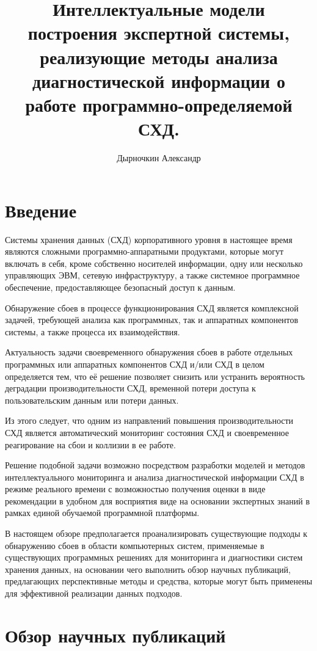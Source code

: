 \documentclass[12pt,a4paper]{article}
\title{Интеллектуальные модели построения экспертной системы, реализующие методы анализа диагностической информации о работе программно-определяемой СХД.}
\author{Дырночкин Александр}
\date{}
\begin{document}
\maketitle

\section*{Введение}

Системы хранения данных (СХД) корпоративного уровня в настоящее время являются сложными программно-аппаратными продуктами, которые могут включать в себя, кроме собственно носителей информации, одну или несколько управляющих ЭВМ, сетевую инфраструктуру, а также системное программное обеспечение, предоставляющее безопасный доступ к данным.

Обнаружение сбоев в процессе функционирования СХД является комплексной задачей, требующей анализа как программных, так и аппаратных компонентов системы, а также процесса их взаимодействия.

Актуальность задачи своевременного обнаружения сбоев в работе отдельных программных или аппаратных компонентов СХД и/или СХД в целом определяется тем, что её решение позволяет снизить или устранить вероятность деградации производительности СХД, временной потери доступа к пользовательским данным или потери данных.

Из этого следует, что одним из направлений повышения производительности СХД является автоматический мониторинг состояния СХД и своевременное реагирование на сбои и коллизии в ее работе.

Решение подобной задачи возможно посредством разработки моделей и методов интеллектуального мониторинга и анализа диагностической информации СХД в режиме реального времени с возможностью получения оценки в виде рекомендации в удобном для восприятия виде на основании экспертных знаний в рамках единой обучаемой программной платформы.

В настоящем обзоре предполагается проанализировать существующие подходы к обнаружению сбоев в области компьютерных систем, применяемые в существующих программных решениях для мониторинга и диагностики систем хранения данных, на основании чего выполнить обзор научных публикаций, предлагающих перспективные методы и средства, которые могут быть применены для эффективной реализации данных подходов.

\section*{Обзор научных публикаций}
\end{document}

